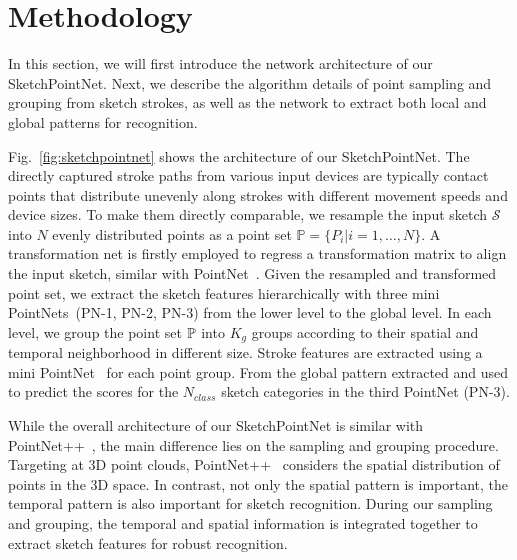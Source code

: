 

\section{Methodology}
\label{sec:methodology}

In this section, we will first introduce the network architecture of our SketchPointNet. Next, we describe the algorithm details of point sampling and grouping from sketch strokes, as well as the network to extract both local and global patterns for recognition.


\vspace{0.1cm}
Fig.~\ref{fig:sketchpointnet} shows the architecture of our SketchPointNet.
%
The directly captured stroke paths from various input devices are typically contact points that distribute unevenly along strokes with different movement speeds and device sizes.
To make them directly comparable, we resample the input sketch $\mathcal{S}$ into $N$ evenly distributed points as a point set $\mathbb{P}=\{P_i|i=1,\ldots,N\}$.
A transformation net is firstly employed to regress a transformation matrix to align the input sketch, similar with PointNet~\cite{qi2017pointnetplusplus}.
%
Given the resampled and transformed point set, we extract the sketch features hierarchically with three mini PointNets~(PN-1, PN-2, PN-3) from the lower level to the global level.
%
In each level, we group the point set $\mathbb{P}$ into $K_g$ groups according to their spatial and temporal neighborhood in different size.
Stroke features are extracted using a mini PointNet~\cite{qi2017pointnetplusplus} for each point group.
%
From the global pattern extracted and used to predict the scores for the $N_{class}$ sketch categories in the third PointNet (PN-3).


While the overall architecture of our SketchPointNet is similar with PointNet++~\cite{qi2017pointnetplusplus}, the main difference lies on the sampling and grouping procedure.
Targeting at 3D point clouds, PointNet++~\cite{qi2017pointnetplusplus} considers the spatial distribution of points in the 3D space.
In contrast, not only the spatial pattern is important, the temporal pattern is also important for sketch recognition.
%
During our sampling and grouping, the temporal and spatial information is integrated together to extract sketch features for robust recognition.


